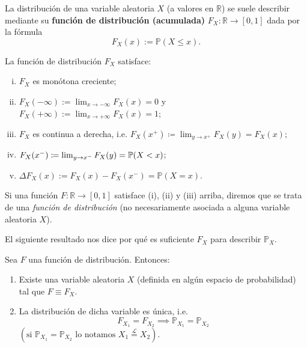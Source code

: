 La distribución de una variable aleatoria \(X\) (a valores en \(\mathbb{R}\)) se suele describir mediante su \textbf{función de distribución (acumulada)} \(F_X: \mathbb{R} \to [0,1]\) dada por la fórmula
\[
F_X(x) := \mathbb{P}(X \le x).
\]

\begin{property}
	La función de distribución \(F_X\) satisface:
	\begin{enumerate}[i)]
		\item \(F_X\) es monótona creciente;

		\item $F_{X}(-\infty) := \lim_{x \to -\infty} F_{X}(x) = 0$ y $F_X(+\infty) := \lim_{x \to +\infty} F_X(x) = 1$;

		\item \(F_X\) es continua a derecha, i.e. $F_{X}(x^{+}) \coloneq \lim_{y \to x^{+}} F_{X}(y) = F_{X}(x)$;

		\item $F_{X}(x^{-}) \coloneq \lim_{y \to x^{-}} F_{X}(y) = \mathbb{P}(X < x)$;

		\item $\Delta F_X(x) := F_X(x) - F_X(x^-) = \mathbb{P}(X = x)$.
	\end{enumerate}
\end{property}
\medskip \par
Si una función \(F: \mathbb{R} \to [0,1]\) satisface (i), (ii) y (iii) arriba, diremos que se trata de una \textit{función de distribución} (no necesariamente asociada a alguna variable aleatoria \(X\)).
\medskip \par
El siguiente resultado nos dice por qué es suficiente \(F_X\) para describir \(\mathbb{P}_X\).

\begin{theorem}
    Sea \(F\) una función de distribución. Entonces:
    \begin{enumerate}
        \item Existe una variable aleatoria \(X\) (definida en algún espacio de probabilidad) tal que \(F \equiv F_X\).
        \item La distribución de dicha variable es única, i.e.
        \[
        F_{X_1} = F_{X_2} \implies \mathbb{P}_{X_1} = \mathbb{P}_{X_2} \]
		$(\text{si } \mathbb{P}_{X_1} = \mathbb{P}_{X_2} \text{ lo notamos } X_1 \overset{\mathcal{L}}{=} X_2)$.
    \end{enumerate}
\end{theorem}

